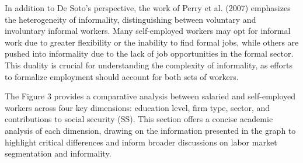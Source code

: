 \documentclass[english]{article}
\begin{document}
\begin{enumerate}
In addition to De Soto’s perspective, the work of Perry et al. (2007) emphasizes the heterogeneity of informality, distinguishing between voluntary and involuntary informal workers. Many self-employed workers may opt for informal work due to greater flexibility or the inability to find formal jobs, while others are pushed into informality due to the lack of job opportunities in the formal sector. This duality is crucial for understanding the complexity of informality, as efforts to formalize employment should account for both sets of workers.

The Figure 3 provides a comparative analysis between salaried and self-employed workers across four key dimensions: education level, firm type, sector, and contributions to social security (SS). This section offers a concise academic analysis of each dimension, drawing on the information presented in the graph to highlight critical differences and inform broader discussions on labor market segmentation and informality.


\end{enumerate}
\end{document}
